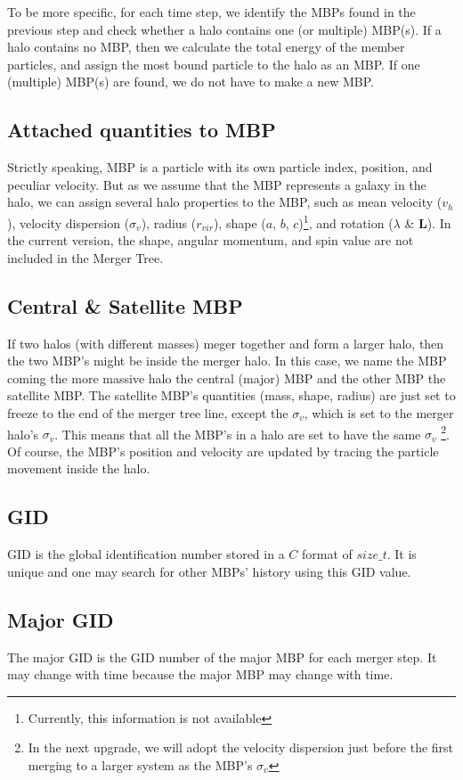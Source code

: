 \documentclass[openleft]{memoir}
\begin{document}
To be more specific, for each time step, we identify the MBPs found in the previous step and check whether a halo 
contains one (or multiple) MBP(s). If a halo contains no MBP, then we calculate the total energy of the member particles,
and assign the most bound particle to the halo as an MBP. If one (multiple) MBP(s) are found, we do not have to make a new MBP.


\subsection{Attached quantities to MBP}
Strictly speaking, MBP is a particle with its own particle index, position, and peculiar velocity. But as we assume
that the MBP represents a galaxy in the halo, we can assign several halo properties to the MBP, such as
mean velocity ($v_h$), velocity dispersion ($\sigma_v$), radius ($r_{vir}$), shape ($a$, $b$, $c$)\footnote{Currently, this information is not available}, and rotation
($\lambda$ \& $\boldsymbol{L}$). In the current version, the shape, angular momentum, and spin value are
not included in the Merger Tree.


\subsection{Central \& Satellite MBP}
If two halos (with different masses) meger together and form a larger halo, then the two MBP's might be inside the merger halo.
In this case, we name the MBP coming the more massive halo the central (major) MBP and the other MBP the satellite MBP.
The satellite MBP's quantities (mass, shape, radius) 
are just set to freeze to the end of the merger tree line, except the $\sigma_v$, which
is set to the merger halo's $\sigma_v$. This means that all the MBP's in a halo are set to have the same $\sigma_v$
\footnote{In the next upgrade, we will adopt the velocity dispersion just before the first merging to a larger system
as the MBP's $\sigma_v$}.
Of course, the MBP's position and velocity are updated by tracing the particle movement inside the halo.

\subsection{GID}
GID is the global identification number stored in a $C$ format of $size\_t$. It is unique and one may search for
other MBPs' history using this GID value.

\subsection{Major GID}
The major GID is the GID number of the major MBP for each merger step. It may change with time because the
major MBP may change with time.
\end{document}
